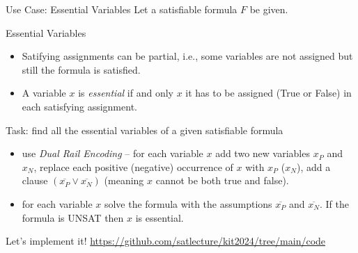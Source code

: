 \documentclass[t]{sdqbeamer}
\begin{document}
\begin{frame}{Use Case: Essential Variables}
Let a satisfiable formula $F$ be given.
\begin{block}{Essential Variables}
\begin{itemize}\setlength{\itemsep}{1em}
	\item Satifying assignments can be partial, i.e., some variables are not assigned but still the formula is satisfied.
	\item A variable $x$ is \emph{essential} if and only $x$ it has to be assigned (True or False) in each satisfying assignment.
\end{itemize}
\end{block}
\begin{block}{Task: find all the essential variables of a given satisfiable formula}
	\begin{itemize}\setlength{\itemsep}{1ex}
		\item use \emph{Dual Rail Encoding} -- for each variable $x$ add two new variables $x_P$ and $x_N$,
		replace each positive (negative) occurrence of $x$ with $x_P$ ($x_N$), add a clause
		$(\overline{x_P} \vee \overline{x_N})$ (meaning $x$ cannot be both true and false).
		\item for each variable $x$ solve the formula with the assumptions $\overline{x_P}$ and
		$\overline{x_N}$. If the formula is UNSAT then $x$ is essential.
	\end{itemize}
\end{block}
\begin{alert}{Let's implement it!}
	\href{https://github.com/satlecture/kit2024/tree/main/code}{https://github.com/satlecture/kit2024/tree/main/code}
\end{alert}
\end{frame}



% 
% 

\end{document}
